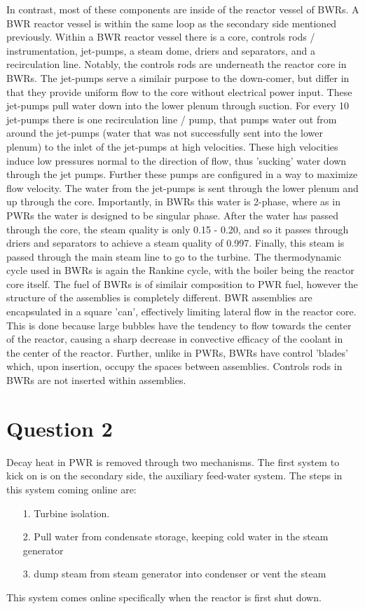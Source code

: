 \documentclass{article}
\begin{document}
In contrast, most of these components are inside of the reactor vessel of BWRs. A BWR reactor vessel is within the same loop as the secondary side mentioned previously. Within a BWR reactor vessel there is a core, controls rods / instrumentation, jet-pumps, a steam dome, driers and separators, and a recirculation line. Notably, the controls rods are underneath the reactor core in BWRs. The jet-pumps serve a similair purpose to the down-comer, but differ in that they provide uniform flow to the core without electrical power input. These jet-pumps pull water down into the lower plenum through suction. For every 10 jet-pumps there is one recirculation line / pump, that pumps water out from around the jet-pumps (water that was not successfully sent into the lower plenum) to the inlet of the jet-pumps at high velocities. These high velocities induce low pressures normal to the direction of flow, thus 'sucking' water down through the jet pumps. Further these pumps are configured in a way to maximize flow velocity. The water from the jet-pumps is sent through the lower plenum and up through the core. Importantly, in BWRs this water is 2-phase, where as in PWRs the water is designed to be singular phase. After the water has passed through the core, the steam quality is only 0.15 - 0.20, and so it passes through driers and separators to achieve a steam quality of 0.997. Finally, this steam is passed through the main steam line to go to the turbine. The thermodynamic cycle used in BWRs is again the Rankine cycle, with the boiler being the reactor core itself. The fuel of BWRs is of similair composition to PWR fuel, however the structure of the assemblies is completely different. BWR assemblies are encapsulated in a square 'can', effectively limiting lateral flow in the reactor core. This is done because large bubbles have the tendency to flow towards the center of the reactor, causing a sharp decrease in convective efficacy of the coolant in the center of the reactor. Further, unlike in PWRs, BWRs have control 'blades' which, upon insertion, occupy the spaces between assemblies. Controls rods in BWRs are not inserted within assemblies. 

\section*{Question 2}

Decay heat in PWR is removed through two mechanisms. The first system to kick on is on the secondary side, the auxiliary feed-water system. The steps in this system coming online are:
\begin{itemize}
    \item[1.] Turbine isolation. 
    \item [2.] Pull water from condensate storage, keeping cold water in the steam generator
    \item[3.] dump steam from steam generator into condenser or vent the steam
\end{itemize}
This system comes online specifically when the reactor is first shut down. 
\end{document}
